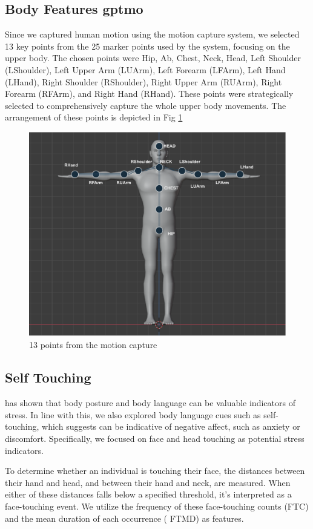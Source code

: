 \subsection{Body Features \gls{gptmo}}
Since we captured human motion using the motion capture system, we selected 13 key points from the 25 marker points used by the system, focusing on the upper body. The chosen points were Hip, Ab, Chest, Neck, Head, Left Shoulder (LShoulder), Left Upper Arm (LUArm), Left Forearm (LFArm), Left Hand (LHand), Right Shoulder (RShoulder), Right Upper Arm (RUArm), Right Forearm (RFArm), and Right Hand (RHand). These points were strategically selected to comprehensively capture the whole upper body movements. The arrangement of these points is depicted in Fig \ref{fig:human1}



\begin{figure}[!htbp]
	\centering
	\includegraphics[width=0.8\columnwidth]{images/humandraw.pdf}
	\caption{13 points from the motion capture} 
	\label{fig:human1}
\end{figure}
\subsection*{Self Touching} 
\textcite{10.1371/journal.pone.0043571} has shown that body posture and body language can be valuable indicators of stress. In line with this, we also explored body language cues such as self-touching, which \textcite{HARRIGAN19851161}suggests can be indicative of negative affect, such as anxiety or discomfort. Specifically, we focused on face and head touching as potential stress indicators.

To determine whether an individual is touching their face, the distances between their hand and head, and between their hand and neck, are measured. When either of these distances falls below a specified threshold, it's interpreted as a face-touching event. We utilize the frequency of these face-touching counts (FTC) and the mean duration of each occurrence ( FTMD) as features.\parencite{Aigrain2016} 

